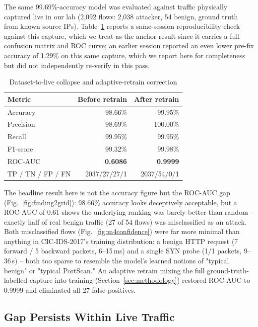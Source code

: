 \documentclass[conference]{IEEEtran}
\begin{document}
The same 99.69\%-accuracy model was evaluated against traffic physically
captured live in our lab (2{,}092 flows: 2{,}038 attacker, 54 benign,
ground truth from known source IPs). Table~\ref{tab:table3} reports a
same-session reproducibility check against this capture, which we treat as
the anchor result since it carries a full confusion matrix and ROC curve;
an earlier session reported an even lower pre-fix accuracy of 1.29\% on
this same capture, which we report here for completeness but did not
independently re-verify in this pass.

\begin{table}[t]
\centering
\caption{Dataset-to-live collapse and adaptive-retrain correction}
\label{tab:table3}
\begin{tabular}{lrr}
\toprule
Metric & Before retrain & After retrain \\
\midrule
Accuracy & 98.66\% & 99.95\% \\
Precision & 98.69\% & 100.00\% \\
Recall & 99.95\% & 99.95\% \\
F1-score & 99.32\% & 99.98\% \\
ROC-AUC & \textbf{0.6086} & \textbf{0.9999} \\
TP / TN / FP / FN & 2037/27/27/1 & 2037/54/0/1 \\
\bottomrule
\end{tabular}
\end{table}

The headline result here is not the accuracy figure but the ROC-AUC gap
(Fig.~\ref{fig:finding2grid}): 98.66\% accuracy looks deceptively
acceptable, but a ROC-AUC of 0.61 shows the underlying ranking was barely
better than random -- exactly half of
real benign traffic (27 of 54 flows) was misclassified as an attack. Both
misclassified flows (Fig.~\ref{fig:m4confidence}) were far more minimal
than anything in CIC-IDS-2017's training distribution: a benign HTTP
request (7 forward / 5 backward packets, 6--15\,ms) and a single SYN probe
(1/1 packets, 9--36\,\textmu s) -- both too sparse to resemble the model's
learned notions of "typical benign" or "typical PortScan." An adaptive
retrain mixing the full ground-truth-labelled capture into training
(Section~\ref{sec:methodology}) restored ROC-AUC to 0.9999 and eliminated
all 27 false positives.

\subsection{Gap Persists Within Live Traffic}
\end{document}

